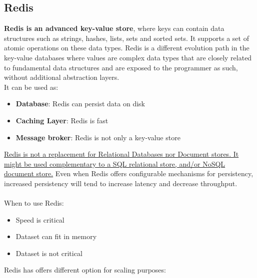 \documentclass[10pt,a4paper]{article}
\newcommand{\nline}{\\~\\}
\begin{document}
\subsection{Redis}
\textbf{Redis is an advanced key-value store}, where keys can contain data structures such as strings, hashes, lists, sets and sorted sets. It supports a set of atomic operations on these data types. Redis is a different evolution path in the key-value databases where values are complex data types that are closely related to fundamental data structures and are exposed to the programmer as such, without additional abstraction layers. \\
It can be used as:
\begin{itemize}
	\item \textbf{Database}: Redis can persist data on disk
	\item \textbf{Caching Layer}: Redis is fast
	\item \textbf{Message broker}: Redis is not only a key-value store
\end{itemize}
\uline{Redis is not a replacement for Relational Databases nor Document stores. It might be used complementary to a SQL relational store, and/or NoSQL document store.} Even when Redis offers configurable mechanisms for persistency, increased persistency will tend to increase latency and decrease throughput.
\nline
When to use Redis:
\begin{itemize}
	\item Speed is critical
	\item Dataset can fit in memory
	\item Dataset is not critical
\end{itemize}
Redis has offers different option for scaling purposes:
\end{document}
